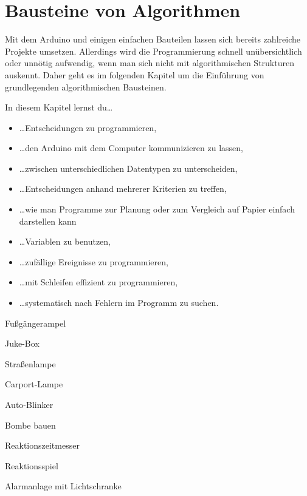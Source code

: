 \pagecolor{CadetBlue!70!green}
\chapter{Bausteine von Algorithmen}
\label{kap:bausteinealgorithmen}

Mit dem Arduino und einigen einfachen Bauteilen lassen sich bereits zahlreiche Projekte umsetzen. Allerdings wird die Programmierung schnell unübersichtlich oder unnötig aufwendig, wenn man sich nicht mit algorithmischen Strukturen auskennt. Daher geht es im folgenden Kapitel um die Einführung von grundlegenden algorithmischen Bausteinen.

\bigskip
In diesem Kapitel lernst du\dots
\begin{itemize}
	\item \dots Entscheidungen zu programmieren,
	\item \dots den Arduino mit dem Computer kommunizieren zu lassen,
	\item \dots zwischen unterschiedlichen Datentypen zu unterscheiden,
	\item \dots Entscheidungen anhand mehrerer Kriterien zu treffen,
	\item \dots wie man Programme zur Planung oder zum Vergleich auf Papier einfach darstellen kann
	\item \dots Variablen zu benutzen,
	\item \dots zufällige Ereignisse zu programmieren,
	\item \dots mit Schleifen effizient zu programmieren,
	\item \dots systematisch nach Fehlern im Programm zu suchen.
\end{itemize}

\bigskip

\bigskip

\begin{projektueberblick}
	\item Fußgängerampel \dotfill \pageref{proj:fussampel}
	\item Juke-Box \dotfill \pageref{proj:jukebox}
	\item Straßenlampe \dotfill \pageref{proj:strassenlampe}
	\item Carport-Lampe \dotfill \pageref{proj:carportlampe}
	\item Auto-Blinker \dotfill \pageref{proj:blinker}
	\item Bombe bauen \dotfill \pageref{proj:bombe}
	\item Reaktionszeitmesser \dotfill \pageref{proj:reaktionszeitmesser}
	\item Reaktionsspiel \dotfill \pageref{proj:reaktionsspiel}
	\item Alarmanlage mit Lichtschranke \dotfill \pageref{proj:alarmanlage}
\end{projektueberblick}

